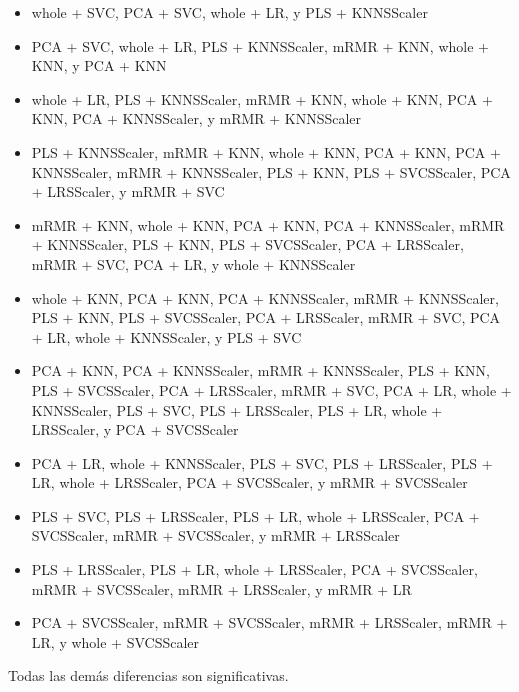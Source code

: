 \documentclass[a4paper,oneside,11pt,leqno]{article}
\begin{document}
	\begin{itemize}
		\item whole + SVC, PCA + SVC, whole + LR, y PLS + KNNSScaler
		
		\item PCA + SVC, whole + LR, PLS + KNNSScaler, mRMR + KNN, whole + KNN, y PCA + KNN
		
		\item whole + LR, PLS + KNNSScaler, mRMR + KNN, whole + KNN, PCA + KNN, PCA + KNNSScaler, y mRMR + KNNSScaler
		
		\item PLS + KNNSScaler, mRMR + KNN, whole + KNN, PCA + KNN, PCA + KNNSScaler, mRMR + KNNSScaler, PLS + KNN, PLS + SVCSScaler, PCA + LRSScaler, y mRMR + SVC
		
		\item mRMR + KNN, whole + KNN, PCA + KNN, PCA + KNNSScaler, mRMR + KNNSScaler, PLS + KNN, PLS + SVCSScaler, PCA + LRSScaler, mRMR + SVC, PCA + LR, y whole + KNNSScaler
		
		\item whole + KNN, PCA + KNN, PCA + KNNSScaler, mRMR + KNNSScaler, PLS + KNN, PLS + SVCSScaler, PCA + LRSScaler, mRMR + SVC, PCA + LR, whole + KNNSScaler, y PLS + SVC
		
		\item PCA + KNN, PCA + KNNSScaler, mRMR + KNNSScaler, PLS + KNN, PLS + SVCSScaler, PCA + LRSScaler, mRMR + SVC, PCA + LR, whole + KNNSScaler, PLS + SVC, PLS + LRSScaler, PLS + LR, whole + LRSScaler, y PCA + SVCSScaler
		
		\item PCA + LR, whole + KNNSScaler, PLS + SVC, PLS + LRSScaler, PLS + LR, whole + LRSScaler, PCA + SVCSScaler, y mRMR + SVCSScaler
		
		\item PLS + SVC, PLS + LRSScaler, PLS + LR, whole + LRSScaler, PCA + SVCSScaler, mRMR + SVCSScaler, y mRMR + LRSScaler
		
		\item PLS + LRSScaler, PLS + LR, whole + LRSScaler, PCA + SVCSScaler, mRMR + SVCSScaler, mRMR + LRSScaler, y mRMR + LR
		
		\item PCA + SVCSScaler, mRMR + SVCSScaler, mRMR + LRSScaler, mRMR + LR, y whole + SVCSScaler
		
	\end{itemize}
	
	Todas las demás diferencias son significativas.
	
\end{document}
